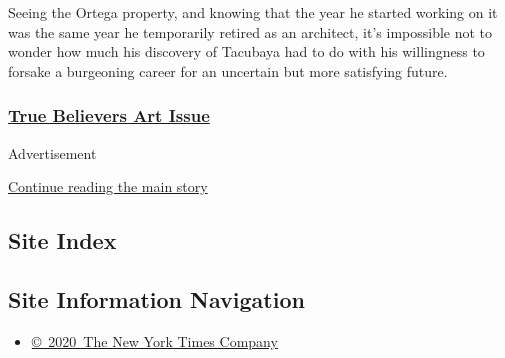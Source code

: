 Seeing the Ortega property, and knowing that the year he started working
on it was the same year he temporarily retired as an architect, it's
impossible not to wonder how much his discovery of Tacubaya had to do
with his willingness to forsake a burgeoning career for an uncertain but
more satisfying future.

\hypertarget{true-believers-art-issue}{%
\subsubsection{\texorpdfstring{\href{https://www.nytimes3xbfgragh.onion/issue/t-magazine/2020/07/02/true-believers-art-issue}{True
Believers Art
Issue}}{True Believers Art Issue}}\label{true-believers-art-issue}}

Advertisement

\protect\hyperlink{after-bottom}{Continue reading the main story}

\hypertarget{site-index}{%
\subsection{Site Index}\label{site-index}}

\hypertarget{site-information-navigation}{%
\subsection{Site Information
Navigation}\label{site-information-navigation}}

\begin{itemize}
\tightlist
\item
  \href{https://help.nytimes3xbfgragh.onion/hc/en-us/articles/115014792127-Copyright-notice}{©~2020~The
  New York Times Company}
\end{itemize}

